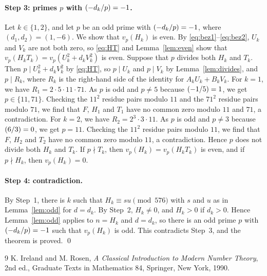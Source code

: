 \documentclass[11pt]{article}
\newcommand{\leg}[2]{\mathchoice{\biggl(\dfrac{#1}{#2}\biggr)}{(#1/#2)}{(#1/#2)}{(#1/#2)}}
\begin{document}
\paragraph{Step 3: primes $p$ with $\leg{-d_k}{p}=-1$.} Let $k\in\{1,2\}$, and let $p$ be an odd prime with $\leg{-d_k}{p}=-1$, where $(d_{1},d_{2})=(1,-6)$. We show that $v_p(H_k)$ is even. By \eqref{eq:bez1}--\eqref{eq:bez2}, $U_k$ and $V_k$ are not both zero, so \eqref{eq:HT} and Lemma~\ref{lem:even} show that $v_p(H_kT_k)=v_p(U_k^2+d_kV_k^2)$ is even. Suppose that $p$ divides both $H_k$ and $T_k$. Then $p\mid U_k^2+d_kV_k^2$ by \eqref{eq:HT}, so $p\mid U_k$ and $p\mid V_k$ by Lemma~\ref{lem:divides}, and $p\mid R_k$, where $R_k$ is the right-hand side of the identity for $A_kU_k+B_kV_k$. For $k=1$, we have $R_{1}=2\cdot 5\cdot 11\cdot 71$. As $p$ is odd and $p\neq5$ because $\leg{-1}{5}=1$, we get $p\in\{11,71\}$. Checking the $11^2$ residue pairs modulo $11$ and the $71^2$ residue pairs modulo $71$, we find that $F$, $H_{1}$ and $T_{1}$ have no common zero modulo $11$ and $71$, a contradiction. For $k=2$, we have $R_{2}=2^{3}\cdot 3\cdot 11$. As $p$ is odd and $p\neq3$ because $\leg{6}{3}=0$, we get $p=11$. Checking the $11^2$ residue pairs modulo $11$, we find that $F$, $H_{2}$ and $T_{2}$ have no common zero modulo $11$, a contradiction. Hence $p$ does not divide both $H_k$ and $T_k$. If $p\nmid T_k$, then $v_p(H_k)=v_p(H_kT_k)$ is even, and if $p\nmid H_k$, then $v_p(H_k)=0$.

\paragraph{Step 4: contradiction.} By Step~1, there is $k$ such that $H_k\equiv su\pmod{576}$ with $s$ and $u$ as in Lemma~\ref{lem:odd} for $d=d_k$. By Step~2, $H_k\neq0$, and $H_k>0$ if $d_k>0$. Hence Lemma~\ref{lem:odd} applies to $n=H_k$ and $d=d_k$, so there is an odd prime $p$ with $\leg{-d_k}{p}=-1$ such that $v_p(H_k)$ is odd. This contradicts Step~3, and the theorem is proved.
\qed

\begin{thebibliography}{9}
 K. Ireland and M. Rosen, \emph{A Classical Introduction to Modern Number Theory}, 2nd ed., Graduate Texts in Mathematics 84, Springer, New York, 1990.
\end{thebibliography}
\end{document}
